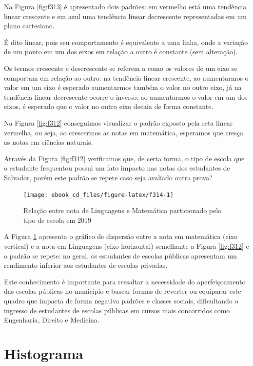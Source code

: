 \documentclass[
  portuguese,
  oneside]{book}
\begin{document}
Na Figura \ref{fig:f313} é apresentado dois padrões: em vermelho está uma tendência linear crescente e em azul uma tendência linear decrescente representadas em um plano cartesiano.

É dito linear, pois seu comportamento é equivalente a uma linha, onde a variação de um ponto em um dos eixos em relação a outro é constante (sem alteração).

Os termos crescente e descrescente se referem a como os valores de um eixo se comportam em relação ao outro: na tendência linear crescente, ao aumentarmos o valor em um eixo é esperado aumentarmos também o valor no outro eixo, já na tendência linear decrescente ocorre o inverso: ao aumentarmos o valor em um dos eixos, é esperado que o valor no outro eixo decaia de forma constante.

Na Figura \ref{fig:f312} conseguimos visualizar o padrão exposto pela reta linear vermelha, ou seja, ao crescermos as notas em matemática, esperamos que cresça as notas em ciências naturais.

Através da Figura \ref{fig:f312} verificamos que, de certa forma, o tipo de escola que o estudante frequentou possui um fato impacto nas notas dos estudantes de Salvador, porém este padrão se repete caso seja avaliado outra prova?

\begin{figure}

{\centering \texttt{[image: ebook\_cd\_files/figure-latex/f314-1]} 

}

\caption{Relação entre nota de Linguagens e Matemática particionado pelo tipo de escola em 2019}\label{fig:f314}
\end{figure}

A Figura \ref{fig:f314} apresenta o gráfico de dispersão entre a nota em matemática (eixo vertical) e a nota em Linguagens (eixo horizontal) semelhante a Figura \ref{fig:f312} e o padrão se repete: no geral, os estudantes de escolas públicas apresentam um rendimento inferior aos estudantes de escolas privadas.

Este conhecimento é importante para ressaltar a necessidade do aperfeiçoamento das escolas públicas no município e buscar formas de reverter ou equiparar este quadro que impacta de forma negativa padrões e classes sociais, dificultando o ingresso de estudantes de escolas públicas em cursos mais concorridos como Engenharia, Direito e Medicina.

\hypertarget{ghist}{%
\section{Histograma}\label{ghist}}
\end{document}
